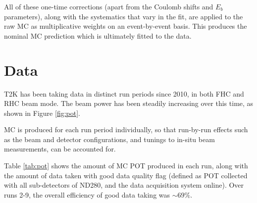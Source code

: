 All of these one-time corrections (apart from the Coulomb shifts and $E_{b}$ parameters), along with the systematics that vary in the fit, are applied to the raw MC as multiplicative weights on an event-by-event basis. This produces the nominal MC prediction which is ultimately fitted to the data.

\section{Data}\label{sec:data}

T2K has been taking data in distinct run periods since 2010, in both FHC and RHC beam mode. The beam power has been steadily increasing over this time, as shown in Figure \ref{fig:pot}.

MC is produced for each run period individually, so that run-by-run effects such as the beam and detector configurations, and tunings to in-situ beam measurements, can be accounted for.

Table \ref{tab:pot} shows the amount of MC POT produced in each run, along with the amount of data taken with good data quality flag (defined as POT collected with all sub-detectors of ND280, and the data acquisition system online). Over runs 2-9, the overall efficiency of good data taking was $\sim69\%$.

